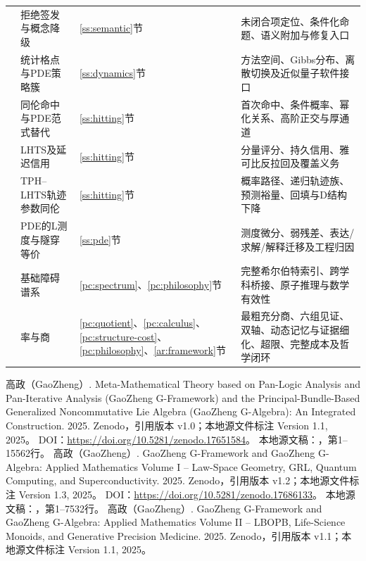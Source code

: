 \documentclass[11pt,a4paper]{article}
\theoremstyle{plain}
\theoremstyle{definition}
\theoremstyle{remark}
\begin{document}
\begin{CJK*}{UTF8}{gkai}
\begin{longtable}{P{0.055\textwidth}P{0.235\textwidth}P{0.16\textwidth}P{0.47\textwidth}}
\cite{S31} & 拒绝签发与概念降级 & \ref{ss:semantic}节 & 未闭合项定位、条件化命题、语义附加与修复入口\\
\cite{S32} & 统计格点与PDE策略簇 & \ref{ss:dynamics}节 & 方法空间、Gibbs分布、离散切换及近似量子软件接口\\
\cite{S33} & 同伦命中与PDE范式替代 & \ref{ss:hitting}节 & 首次命中、条件概率、幂化关系、高阶正交与厚通道\\
\cite{S34} & LHTS及延迟信用 & \ref{ss:hitting}节 & 分量评分、持久信用、雅可比反拉回及覆盖义务\\
\cite{S35} & TPH--LHTS轨迹参数同伦 & \ref{ss:hitting}节 & 概率路径、递归轨迹族、预测裕量、回填与D结构下降\\
\cite{S36} & PDE的L测度与隧穿等价 & \ref{ss:pde}节 & 测度微分、弱残差、表达/求解/解释迁移及工程归因\\
\cite{S37} & 基础障碍谱系 & \ref{pc:spectrum}、\ref{pc:philosophy}节 & 完整希尔伯特索引、跨学科桥接、原子推理与数学有效性\\
\cite{S38} & 率与商 & \ref{pc:quotient}、\ref{pc:calculus}、\ref{pc:structure-cost}、\ref{pc:philosophy}、\ref{ar:framework}节 & 最粗充分商、六组见证、双轴、动态记忆与证据细化、超限、完整成本及哲学闭环\\
\end{longtable}
\normalsize
\clearpage
{}
{}
\begin{thebibliography}{99}
\setlength{\itemsep}{0.65em}
\small
{}
高政（GaoZheng）. Meta-Mathematical Theory based on Pan-Logic Analysis and Pan-Iterative Analysis (GaoZheng G-Framework) and the Principal-Bundle-Based Generalized Noncommutative Lie Algebra (GaoZheng G-Algebra): An Integrated Construction. 2025.
\newblock Zenodo，引用版本 v1.0；本地源文件标注 Version 1.1, 2025。
\newblock DOI：\url{https://doi.org/10.5281/zenodo.17651584}。
\newblock 本地源文稿：，第1--15562行。
高政（GaoZheng）. GaoZheng G-Framework and GaoZheng G-Algebra: Applied Mathematics Volume I -- Law-Space Geometry, GRL, Quantum Computing, and Superconductivity. 2025.
\newblock Zenodo，引用版本 v1.2；本地源文件标注 Version 1.3, 2025。
\newblock DOI：\url{https://doi.org/10.5281/zenodo.17686133}。
\newblock 本地源文稿：，第1--7532行。
高政（GaoZheng）. GaoZheng G-Framework and GaoZheng G-Algebra: Applied Mathematics Volume II -- LBOPB, Life-Science Monoids, and Generative Precision Medicine. 2025.
\newblock Zenodo，引用版本 v1.1；本地源文件标注 Version 1.1, 2025。

\end{thebibliography}
\end{CJK*}
\end{document}
